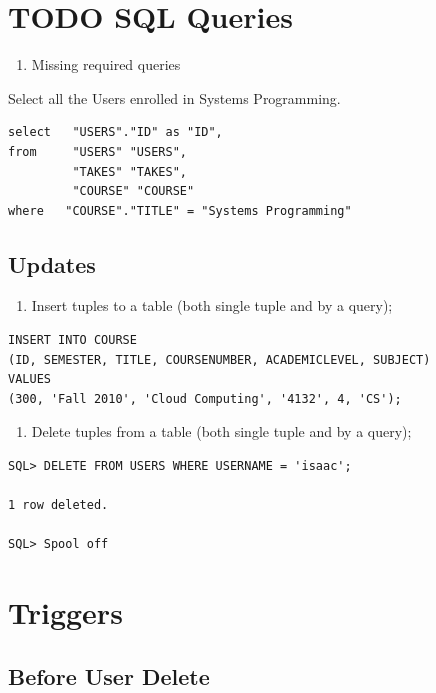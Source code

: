 \documentclass[11pt]{article}
\begin{document}
\section{\textbf{TODO} SQL Queries}
\label{sec-7}

  
\begin{enumerate}
\item Missing required queries
\end{enumerate}

  Select all the Users enrolled in Systems Programming.
     

\begin{verbatim}
select   "USERS"."ID" as "ID",
from     "USERS" "USERS",
         "TAKES" "TAKES",
         "COURSE" "COURSE"
where   "COURSE"."TITLE" = "Systems Programming"
\end{verbatim}
\subsection{Updates}
\label{sec-7-1}


\begin{enumerate}
\item Insert tuples to a table (both single tuple and by a query);
\end{enumerate}


\begin{verbatim}
INSERT INTO COURSE
(ID, SEMESTER, TITLE, COURSENUMBER, ACADEMICLEVEL, SUBJECT)
VALUES
(300, 'Fall 2010', 'Cloud Computing', '4132', 4, 'CS');
\end{verbatim}

\begin{enumerate}
\item Delete tuples from a table (both single tuple and by a query);
\end{enumerate}


\begin{verbatim}
SQL> DELETE FROM USERS WHERE USERNAME = 'isaac';

1 row deleted.

SQL> Spool off
\end{verbatim}
\section{Triggers}
\label{sec-8}

  
\subsection{Before User Delete}
\label{sec-8-1}
\end{document}
